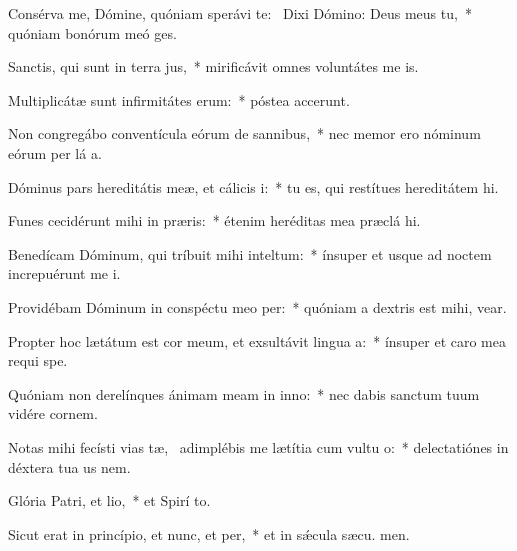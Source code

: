 \item Consérva me, Dómine, quóniam sperávi  te:~\pscross{} Dixi Dómino: Deus meus  tu,~* quóniam bonórum meó  ges.
\item Sanctis, qui sunt in terra jus,~* mirificávit omnes voluntátes me  is.
\item Multiplicátæ sunt infirmitátes erum:~* póstea accerunt.
\item Non congregábo conventícula eórum de sannibus,~* nec memor ero nóminum eórum per lá a.
\item Dóminus pars hereditátis meæ, et cálicis i:~* tu es, qui restítues hereditátem  hi.
\item Funes cecidérunt mihi in præris:~* étenim heréditas mea præclá  hi.
\item Benedícam Dóminum, qui tríbuit mihi inteltum:~* ínsuper et usque ad noctem increpuérunt me  i.
\item Providébam Dóminum in conspéctu meo per:~* quóniam a dextris est mihi,  vear.
\item Propter hoc lætátum est cor meum, et exsultávit lingua a:~* ínsuper et caro mea requi  spe.
\item Quóniam non derelínques ánimam meam in inno:~* nec dabis sanctum tuum vidére cornem.
\item Notas mihi fecísti vias tæ,~\pscross{} adimplébis me lætítia cum vultu o:~* delectatiónes in déxtera tua us  nem.
\item Glória Patri, et lio,~* et Spirí to.
\item Sicut erat in princípio, et nunc, et per,~* et in sǽcula sæcu. men.
